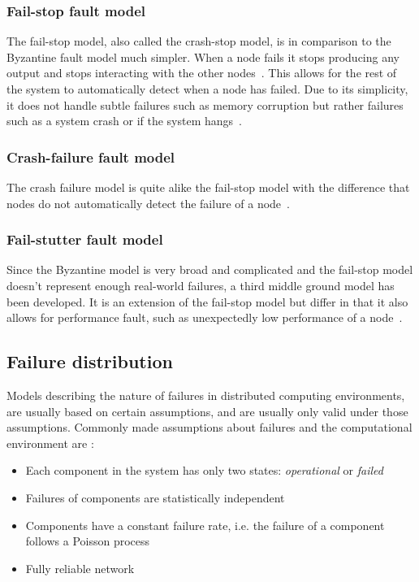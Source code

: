 \documentclass{cslthse-msc}
\begin{document}
\subsubsection{Fail-stop fault model} \label{subsub:background_fail_stop}
The fail-stop model, also called the crash-stop model, is in comparison to the Byzantine fault model much simpler. When a node fails it stops producing any output and stops interacting with the other nodes~\cite{faultTolerantFundamentals}. This allows for the rest of the system to automatically detect when a node has failed. Due to its simplicity, it does not handle subtle failures such as memory corruption but rather failures such as a system crash or if the system hangs~\cite{surveyFaultParallel}.

\subsubsection{Crash-failure fault model}
The crash failure model is quite alike the fail-stop model with the difference that nodes do not automatically detect the failure of a node~\cite{faultTolerantFundamentals, adaptiveAgentReplication}.

\subsubsection{Fail-stutter fault model}
Since the Byzantine model is very broad and complicated and the fail-stop model doesn't represent enough real-world failures, a third middle ground model has been developed. It is an extension of the fail-stop model but differ in that it also allows for performance fault, such as unexpectedly low performance of a node~\cite{surveyFaultParallel}.

\subsection{Failure distribution} \label{subsec:background_failure_distribution}
Models describing the nature of failures in distributed computing environments, are usually based on certain assumptions, and are usually only valid under those assumptions. Commonly made assumptions about failures and the computational environment are \cite{relModelDistSimSystem, relModelAnalysis, cloudServiceRel, studyServiceRel, hierarchicalRelModeling, selfAdaptRel}:
\begin{itemize}
	\item Each component in the system has only two states: \emph{operational} or \emph{failed}
	\item Failures of components are statistically independent
	\item Components have a constant failure rate, i.e. the failure of a component follows a Poisson process
	\item Fully reliable network
\end{itemize}
\end{document}
